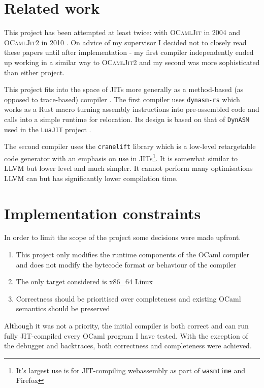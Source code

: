 \section{Related work}

This project has been attempted at least twice: with \textsc{OCamlJit} in 2004 \cite{ocjit1} and
\textsc{OCamlJit2} in 2010 \cite{ocjit2}. On advice of my supervisor I decided not to closely
read these papers until after implementation - my first compiler independently ended up working
in a similar way to \textsc{OCamlJit2} and my second was more sophisticated than either project.

This project fits into the space of JITs more generally as a method-based (as opposed to
trace-based) compiler \cite{pyket}. The first compiler uses \texttt{dynasm-rs} \cite{dynasmrs}
which works as a Rust macro turning assembly instructions into pre-assembled code and calls into
a simple runtime for relocation. Its design is based on that of \texttt{DynASM} used in the
\texttt{LuaJIT} project \cite{dynasm}.

The second compiler uses the \texttt{cranelift} \cite{cranelift} library which is a low-level
retargetable
code generator with an emphasis on use in JITs\footnote{It's largest use is for JIT-compiling
      webassembly as part of \texttt{wasmtime} and Firefox}. It is somewhat similar to LLVM but
lower
level and much simpler. It cannot perform many optimisations LLVM can but has significantly lower
compilation time.

\section{Implementation constraints}

In order to limit the scope of the project some decisions were made upfront.

\begin{enumerate}
      \item This project only modifies the runtime components of the OCaml compiler and does not
            modify the bytecode format or behaviour of the compiler
      \item The only target considered is x86\_64 Linux
      \item Correctness should be prioritised over completeness and existing OCaml semantics should
            be preserved
\end{enumerate}

Although it was not a priority, the initial compiler is both correct and can run fully
JIT-compiled every OCaml program I have tested. With the exception of the debugger and backtraces,
both correctness and completeness were achieved.

